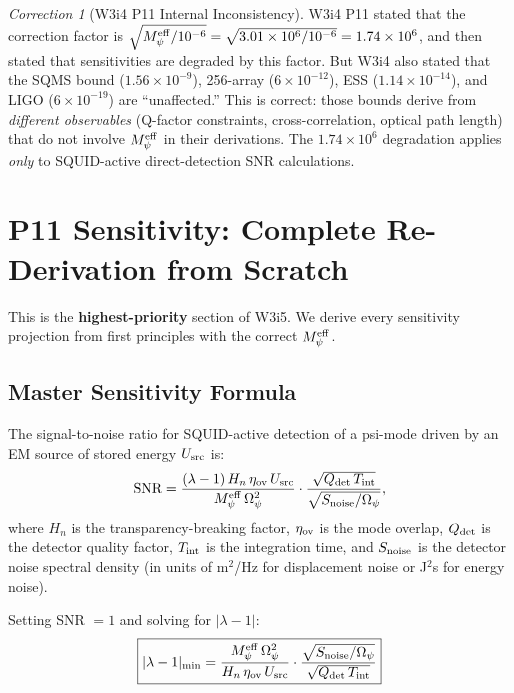 \documentclass[11pt]{article}
\theoremstyle{definition}
\theoremstyle{remark}
\newtheorem{correction}[theorem]{Correction}
\newcommand{\lam}{\lambda}
\newcommand{\Opsi}{\Omega_\psi}
\newcommand{\Meff}{M_\psi^{\rm eff}}
\newcommand{\ee}[1]{\times 10^{#1}}
\begin{document}
\begin{correction}[W3i4 P11 Internal Inconsistency]
\label{cor:w3i4_inconsistency}
W3i4 P11 stated that the correction factor is $\sqrt{\Meff/10^{-6}} =
\sqrt{3.01\ee{6}/10^{-6}} = 1.74\ee{6}$, and then stated that
sensitivities are degraded by this factor. But W3i4 also stated that the
SQMS bound ($1.56\ee{-9}$), 256-array ($6\ee{-12}$), ESS ($1.14\ee{-14}$),
and LIGO ($6\ee{-19}$) are ``unaffected.'' This is correct: those bounds
derive from \emph{different observables} (Q-factor constraints,
cross-correlation, optical path length) that do not involve $\Meff$ in
their derivations. The $1.74\ee{6}$ degradation applies \emph{only} to
SQUID-active direct-detection SNR calculations.
\end{correction}

\section{P11 Sensitivity: Complete Re-Derivation from Scratch}
\label{sec:p11_from_scratch}

This is the \textbf{highest-priority} section of W3i5. We derive every
sensitivity projection from first principles with the correct $\Meff$.

\subsection{Master Sensitivity Formula}

The signal-to-noise ratio for SQUID-active detection of a psi-mode
driven by an EM source of stored energy $U_{\rm src}$ is:
\begin{equation}
\text{SNR} = \frac{(\lam-1)\,H_n\,\eta_{\rm ov}\,U_{\rm src}}
{\Meff\,\Opsi^2}\cdot
\frac{\sqrt{Q_{\rm det}\,T_{\rm int}}}
{\sqrt{S_{\rm noise}/\Opsi}},
\label{eq:master_snr}
\end{equation}
where $H_n$ is the transparency-breaking factor, $\eta_{\rm ov}$ is the
mode overlap, $Q_{\rm det}$ is the detector quality factor,
$T_{\rm int}$ is the integration time, and $S_{\rm noise}$ is the
detector noise spectral density (in units of m$^2$/Hz for displacement
noise or J$^2$s for energy noise).

Setting SNR $= 1$ and solving for $|\lam-1|$:
\begin{equation}
\boxed{
|\lam-1|_{\rm min} = \frac{\Meff\,\Opsi^2}
{H_n\,\eta_{\rm ov}\,U_{\rm src}}\cdot
\frac{\sqrt{S_{\rm noise}/\Opsi}}
{\sqrt{Q_{\rm det}\,T_{\rm int}}}
}
\label{eq:master_sensitivity}
\end{equation}
\end{document}
